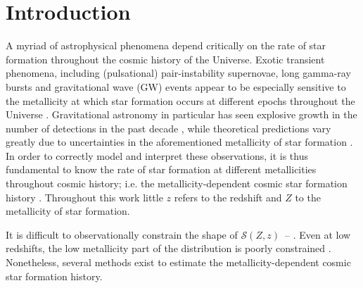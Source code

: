 \documentclass[twocolumn]{aastex631}
\newcommand{\SFRDzZ}{\ensuremath{\mathcal{S}(Z,z)}\xspace}
\begin{document}


\section{Introduction \label{sec: intro}}
A myriad of astrophysical phenomena depend critically on the rate of star formation throughout the cosmic history of the Universe. Exotic transient phenomena, including (pulsational) pair-instability supernovae, long gamma-ray bursts and gravitational wave (GW) events appear to be especially sensitive to the metallicity at which star formation occurs at different epochs throughout the Universe \citep[e.g.,][]{Langer+2007,Fruchter+2006,LIGO2016_implications}.
Gravitational astronomy in particular has seen explosive growth in the number of detections in the past decade \citep[][]{GWTC1,GWTC2,GWTC3}, while theoretical predictions vary greatly due to uncertainties in the aforementioned metallicity of star formation \citep[e.g.,][]{Santoliquido+2021,Broekgaarden+2021b}. In order to correctly model and interpret these observations, it is thus fundamental to know the rate of star formation at different metallicities throughout cosmic history; i.e. the metallicity-dependent cosmic star formation history \citep[\SFRDzZ, see also the recent review by][]{chruslinska2022_review}. Throughout this work little $z$ refers to the redshift and $Z$ to the metallicity of star formation. 


It is difficult to observationally constrain the shape of \SFRDzZ\ -- \citep[see e.g., ][for discussion of relevant observational caveats]{Chruslinska2019_obs,Boco+2021}. Even at low redshifts, the low metallicity part of the distribution is poorly constrained \citep{Chruslinska+2021}.
Nonetheless, several methods exist to estimate the metallicity-dependent cosmic star formation history. 
\end{document}
